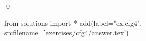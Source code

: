 
\begin{ex} 
  \label{ex:cfg4}
  
  \qed
\end{ex} 
\begin{python0}
from solutions import *
add(label="ex:cfg4",
    srcfilename='exercises/cfg4/answer.tex') 
\end{python0}
